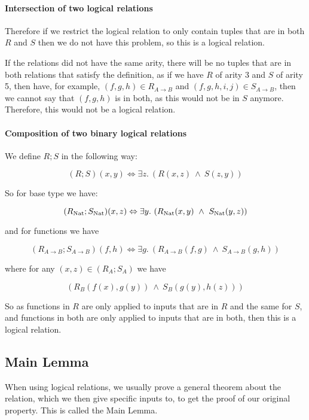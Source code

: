 \paragraph{Intersection of two logical relations}
Therefore if we restrict the logical relation to only contain tuples that are in both $R$ and $S$ then we do not have this problem, so this is a logical relation.

If the relations did not have the same arity, there will be no tuples that are in both relations that satisfy the definition, as if we have $R$ of arity 3 and $S$ of arity 5, then have, for example, $(f,g,h) \in R_{A \to B}$ and $(f,g,h,i,j) \in S_{A \to B}$, then we cannot say that $(f,g,h)$ is in both, as this would not be in $S$ anymore. Therefore, this would not be a logical relation.

\paragraph{Composition of two binary logical relations}
We define $R;S$ in the following way:

\[ (R;S)(x,y) \Leftrightarrow \exists z. \ (R(x,z) \ \wedge \ S(z,y))\]

So for base type we have:

\[ (R_{\operatorname{Nat}};S_{\operatorname{Nat}})(x,z) \Leftrightarrow \exists y. \ (R_{\operatorname{Nat}}(x,y) \ \wedge \ S_{\operatorname{Nat}}(y,z))\]

and for functions we have

\[ (R_{A \to B};S_{A \to B})(f,h) \Leftrightarrow \exists g. \ (R_{A \to B}(f,g) \ \wedge \ S_{A \to B}(g,h))\] 

where for any $(x,z) \in (R_A;S_A)$ we have

\[ (R_B(f(x),g(y)) \ \wedge \ S_B(g(y),h(z)))\] 

So as functions in $R$ are only applied to inputs that are in $R$ and the same for $S$, and functions in both are only applied to inputs that are in both, then this is a logical relation.

 

\subsection{Main Lemma}
When using logical relations, we usually prove a general theorem about the relation, which we then give specific inputs to, to get the proof of our original property. This is called the Main Lemma. %

